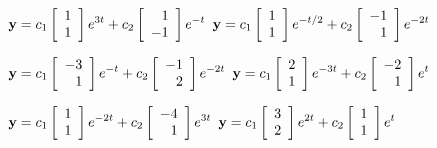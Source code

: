 \medskip

 ${\bf y}=\displaystyle{c_{1}\left[\begin{array}{r}1\\1\end{array}
\right]e^{3t}+c_{2}\left[\begin{array}{r}1\\-1\end{array}\right]
e^{-t}}$
\quad {}
 ${\bf y}=\displaystyle{c_{1}\left[\begin{array}{r}1\\1\end{array}
\right]e^{-t/2}+c_{2}\left[\begin{array}{r}-1\\1\end{array}\right]e^{-2t}}$

\smallskip

 ${\bf y}=\displaystyle{c_{1}\left[\begin{array}{r}-3\\1\end{array}
\right]e^{-t}+c_{2}\left[\begin{array}{r}-1\\2\end{array}
\right]e^{-2t}}$
 ${\bf y}=\displaystyle{c_{1}\left[\begin{array}{r}2\\1\end{array}
\right]e^{-3t}+c_{2}\left[\begin{array}{r}-2\\1\end{array}
\right]e^{t}}$

\smallskip

 ${\bf y}=\displaystyle{c_{1}\left[\begin{array}{r}1\\1
\end{array}\right]e^{-2t}+c_{2}\left[\begin{array}{r}-4\\1\end{array}
\right]e^{3t}}$    \quad
{}
 ${\bf y}=\displaystyle{c_{1}\left[\begin{array}{r}3\\2\end{array}
\right]e^{2t}+c_{2}\left[\begin{array}{r}1\\1\end{array}\right]e^{t}}$

